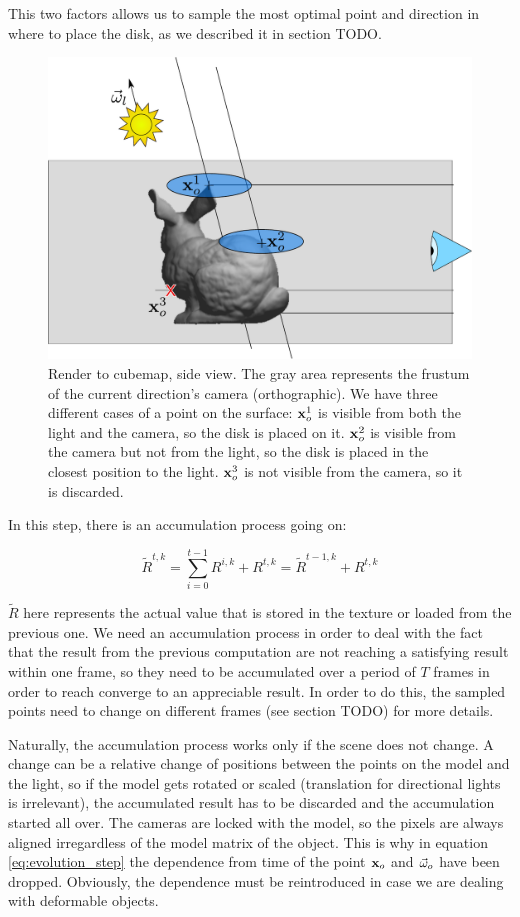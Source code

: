 This two factors allows us to sample the most optimal point and direction in where to place the disk, as we described it in section TODO.
 
\begin{figure}[!ht]
\centering
\includegraphics[width=\linewidth]{images/method/step2}
\caption{Render to cubemap, side view. The gray area represents the frustum of the current direction's camera (orthographic). We have three different cases of a point on the surface: $\mathbf{x}_o^1$ is visible from both the light and the camera, so the disk is placed on it. $\mathbf{x}_o^2$ is visible from the camera but not from the light, so the disk is placed in the closest position to the light. $\mathbf{x}_o^3$ is not visible from the camera, so it is discarded.}
\label{fig:stepfrustum}
\end{figure} 

In this step, there is an accumulation process going on:

$$
\tilde{R}^{t,k} = \sum_{i = 0}^{t-1} R^{i,k} + R^{t,k} = \tilde{R}^{t-1, k} + R^{t,k}
$$

$\tilde{R}$ here represents the actual value that is stored in the texture or loaded from the previous one. We need an accumulation process in order to deal with the fact that the result from the previous computation are not reaching a satisfying result within one frame, so they need to be accumulated over a period of $T$ frames in order to reach converge to an appreciable result. In order to do this, the sampled points need to change on different frames (see section TODO) for more details. 

Naturally, the accumulation process works only if the scene does not change. A change can be a relative change of positions between the points on the model and the light, so if the model gets rotated or scaled (translation for directional lights is irrelevant), the accumulated result has to be discarded and the accumulation started all over. The cameras are locked with the model, so the pixels are always aligned irregardless of the model matrix of the object. This is why in equation \ref{eq:evolution_step} the dependence from time of the point $\mathbf{x}_o$ and $\vec{\omega}_o$ have been dropped. Obviously, the dependence must be reintroduced in case we are dealing with deformable objects.
 
